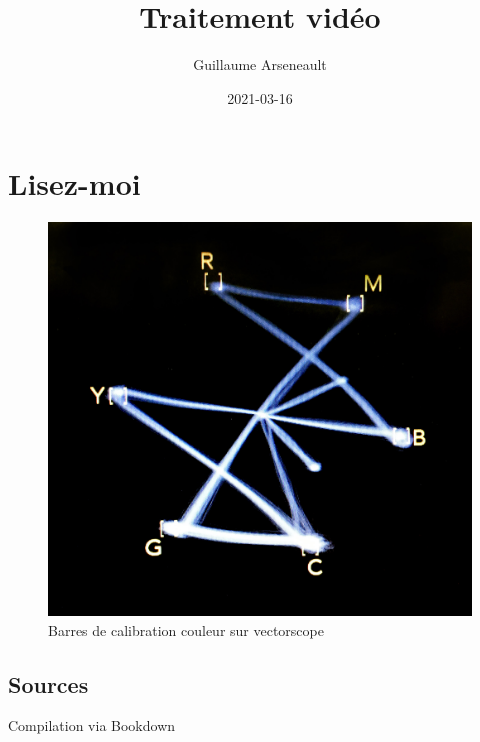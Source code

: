 \documentclass[
  french,
]{book}
\title{Traitement vidéo}
\author{Guillaume Arseneault}
\date{2021-03-16}
\begin{document}
\maketitle

{
\setcounter{tocdepth}{1}
\tableofcontents
}
\hypertarget{lisez-moi}{%
\chapter*{Lisez-moi}\label{lisez-moi}}

\begin{figure}
\centering
\includegraphics{images/vectorscope.jpg}
\caption{\label{fig:unnamed-chunk-1}Barres de calibration couleur sur vectorscope \citep{marsh_ColorBarsVectorscope_2016}}
\end{figure}

\hypertarget{sources}{%
\section*{Sources}\label{sources}}

Compilation via Bookdown \citep{xie_BookdownAuthoringBooks_2020}
\end{document}
